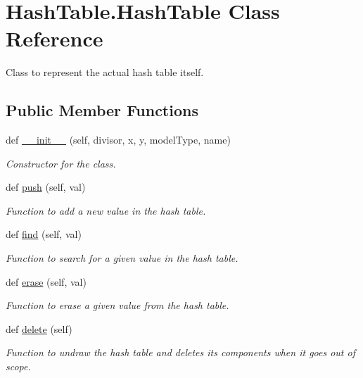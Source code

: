 \hypertarget{class_hash_table_1_1_hash_table}{}\section{Hash\+Table.\+Hash\+Table Class Reference}
\label{class_hash_table_1_1_hash_table}


Class to represent the actual hash table itself.  


\subsection*{Public Member Functions}
\begin{DoxyCompactItemize}
\item 
def \hyperlink{class_hash_table_1_1_hash_table_a775b63cd65429a5c9cfa386c570ff211}{\+\_\+\+\_\+init\+\_\+\+\_\+} (self, divisor, x, y, model\+Type, name)
\begin{DoxyCompactList}\small\item\em Constructor for the class. \end{DoxyCompactList}\item 
def \hyperlink{class_hash_table_1_1_hash_table_a7339efb6b22404d54bbea45484a2c908}{push} (self, val)
\begin{DoxyCompactList}\small\item\em Function to add a new value in the hash table. \end{DoxyCompactList}\item 
def \hyperlink{class_hash_table_1_1_hash_table_a6d4d5b9daeebd3376cba8a52ab3e2704}{find} (self, val)
\begin{DoxyCompactList}\small\item\em Function to search for a given value in the hash table. \end{DoxyCompactList}\item 
def \hyperlink{class_hash_table_1_1_hash_table_a33972a0c632fec72ff9880a1b910a141}{erase} (self, val)
\begin{DoxyCompactList}\small\item\em Function to erase a given value from the hash table. \end{DoxyCompactList}\item 
def \hyperlink{class_hash_table_1_1_hash_table_abf67330f9837015cd00429eb6909f02b}{delete} (self)
\begin{DoxyCompactList}\small\item\em Function to undraw the hash table and deletes its components when it goes out of scope. \end{DoxyCompactList}\end{DoxyCompactItemize}
